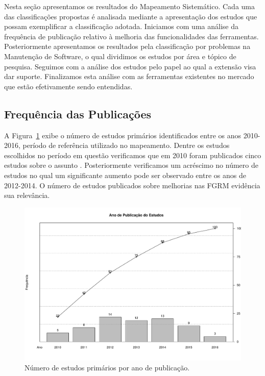 Nesta seção apresentamos os resultados do Mapeamento Sistemático. Cada uma das
classificações propostas é analisada mediante a apresentação dos estudos que
possam exemplificar a classificação adotada.  Iniciamos com uma análise da
frequência de publicação relativo à melhoria das funcionalidades das
ferramentas.  Posteriormente apresentamos os resultados pela classificação por
problemas na Manutenção de Software, o qual dividimos os estudos por área e
tópico de pesquisa. Seguimos com a análise dos estudos pelo papel ao qual a
extensão visa dar suporte. Finalizamos esta análise com as ferramentas
existentes no mercado que estão efetivamente sendo entendidas.

\subsection{Frequência das Publicações}
\label{sub:frequencia_publicacao}

A Figura~\ref{fig:publicacao_por_ano} exibe o número de estudos primários
identificados entre os anos 2010\@-\@2016, período de referência utilizado no
mapeamento. Dentre os estudos escolhidos no período em questão verificamos que
em 2010 foram publicados cinco estudos sobre o assunto
\cite{sun2010discriminative,gegick2010identifying,song2010jdf,nagwani2010predictive,zimmermann2010makes}.
Posteriormente verificamos um acréscimo no número de estudos no qual um
significante aumento pode ser observado entre os anos de 2012\@-\@2014. O
 número de estudos publicados sobre melhorias nas FGRM evidência sua relevância.

\begin{figure}[htpb] \centering
	\includegraphics[width=0.9\linewidth]{chapter-mapeamento-sistematico/img/ano-publicao-estudos.pdf}
	\caption{Número de estudos primários por ano de publicação.}
	\label{fig:publicacao_por_ano} \end{figure}

